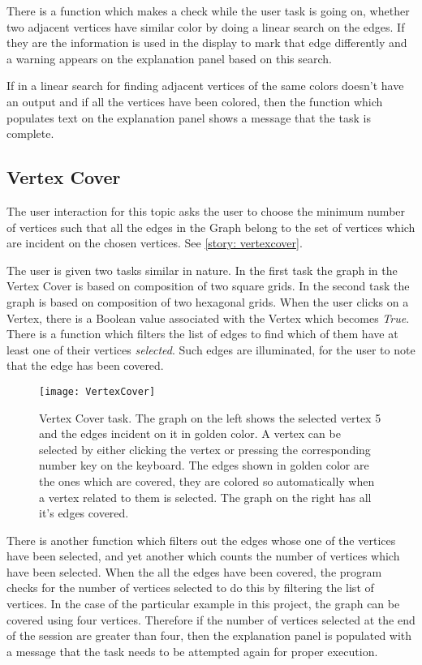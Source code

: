 There is a function which makes a check while the user task is going on, whether
two adjacent vertices have similar color by doing a linear search on the edges.
If they are the information is used in the display to mark that edge differently
and a warning appears on the explanation panel based on this search.

If in a linear search for finding adjacent vertices of the same colors
doesn't have an output and if all the vertices have been colored, then
the function which populates text on the explanation panel shows a message that
the task is complete.

\subsection{Vertex Cover}


The user interaction for this topic asks the user to choose the minimum number
of vertices such that all the edges in the Graph belong to the set of vertices
which are incident on the chosen vertices. See \autoref{story: vertexcover}.

The user is given two tasks similar in nature. In the first task the graph in
the Vertex Cover is based on composition of two square grids. In the second
task the graph is based on composition of two hexagonal grids.  When the user
clicks on a Vertex, there is a Boolean value associated with the Vertex which
becomes \emph{True}. There is a function which filters the list of edges to
find which of them have at least one of their vertices \emph{selected}. Such
edges are illuminated, for the user to note that the edge has been covered.

\begin{figure}[ht]
\centering
\texttt{[image: VertexCover]}
\caption{
        Vertex Cover task. The graph on the left shows the selected vertex 5
        and the edges incident on it in golden color. A vertex can be selected
        by either clicking the vertex or pressing the corresponding number key
        on the keyboard. The edges shown in golden color are the ones which are
        covered, they are colored so automatically when a vertex related to
        them is selected. The graph on the right has all it's edges covered.
        }
\label{animationfigure: vertexCover}
\end{figure}
There is another function which filters out the edges whose one of the vertices
have been selected, and yet another which counts the number of vertices which
have been selected.  When the all the edges have been covered, the program
checks for the number of vertices selected to do this by filtering the list of
vertices. In the case of the particular example in this project, the graph can
be covered using four vertices. Therefore if the number of vertices selected at
the end of the session are greater than four, then the explanation panel is
populated with a message that the task needs to be attempted again for proper
execution.

